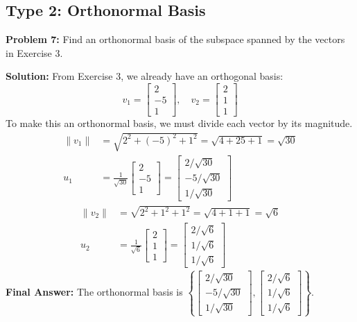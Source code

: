 \documentclass[11pt, letterpaper]{article}
\theoremstyle{definition}
\theoremstyle{remark}
\begin{document}
\subsection{Type 2: Orthonormal Basis}

\textbf{Problem 7:} 
Find an orthonormal basis of the subspace spanned by the vectors in Exercise 3.

\textbf{Solution:}
From Exercise 3, we already have an orthogonal basis:
\[ v_1 = \begin{bmatrix} 2 \\ -5 \\ 1 \end{bmatrix}, \quad v_2 = \begin{bmatrix} 2 \\ 1 \\ 1 \end{bmatrix} \]
To make this an orthonormal basis, we must divide each vector by its magnitude.
\begin{align*}
    \|v_1\| &= \sqrt{2^2 + (-5)^2 + 1^2} = \sqrt{4 + 25 + 1} = \sqrt{30} \\
    u_1 &= \frac{1}{\sqrt{30}} \begin{bmatrix} 2 \\ -5 \\ 1 \end{bmatrix} = \begin{bmatrix} 2/\sqrt{30} \\ -5/\sqrt{30} \\ 1/\sqrt{30} \end{bmatrix}
\end{align*}
\begin{align*}
    \|v_2\| &= \sqrt{2^2 + 1^2 + 1^2} = \sqrt{4 + 1 + 1} = \sqrt{6} \\
    u_2 &= \frac{1}{\sqrt{6}} \begin{bmatrix} 2 \\ 1 \\ 1 \end{bmatrix} = \begin{bmatrix} 2/\sqrt{6} \\ 1/\sqrt{6} \\ 1/\sqrt{6} \end{bmatrix}
\end{align*}
\textbf{Final Answer:} The orthonormal basis is $\left\{ \begin{bmatrix} 2/\sqrt{30} \\ -5/\sqrt{30} \\ 1/\sqrt{30} \end{bmatrix}, \begin{bmatrix} 2/\sqrt{6} \\ 1/\sqrt{6} \\ 1/\sqrt{6} \end{bmatrix} \right\}$.
\end{document}
